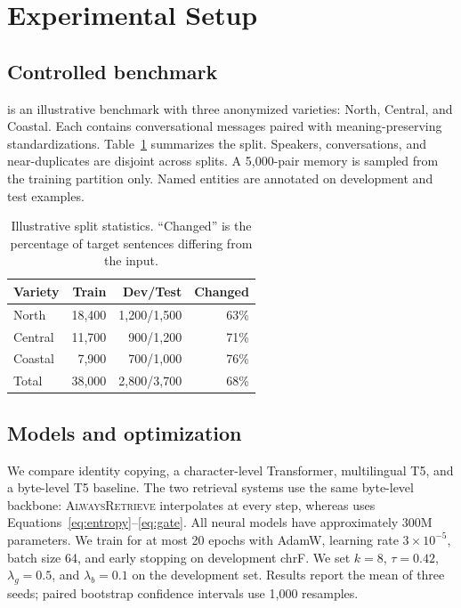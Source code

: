 \section{Experimental Setup}
\label{sec:setup}

\subsection{Controlled benchmark}

\dataset{} is an illustrative benchmark with three anonymized varieties:
North, Central, and Coastal. Each contains conversational messages paired
with meaning-preserving standardizations. Table~\ref{tab:data} summarizes the
split. Speakers, conversations, and near-duplicates are disjoint across
splits. A 5,000-pair memory is sampled from the training partition only.
Named entities are annotated on development and test examples.

\begin{table}[t]
  \centering
  \caption{Illustrative \dataset{} split statistics. ``Changed'' is the
  percentage of target sentences differing from the input.}
  \label{tab:data}
  \small
  \begin{tabular}{lrrr}
    \toprule
    Variety & Train & Dev/Test & Changed \\
    \midrule
    North   & 18,400 & 1,200/1,500 & 63\% \\
    Central & 11,700 &   900/1,200 & 71\% \\
    Coastal &  7,900 &   700/1,000 & 76\% \\
    \midrule
    Total   & 38,000 & 2,800/3,700 & 68\% \\
    \bottomrule
  \end{tabular}
\end{table}

\subsection{Models and optimization}

We compare identity copying, a character-level Transformer, multilingual T5,
and a byte-level T5 baseline. The two retrieval systems use the same
byte-level backbone: \textsc{AlwaysRetrieve} interpolates at every step,
whereas \method uses Equations~\ref{eq:entropy}--\ref{eq:gate}. All neural
models have approximately 300M parameters. We train for at most 20 epochs with
AdamW, learning rate $3\times10^{-5}$, batch size 64, and early stopping on
development chrF. We set $k=8$, $\tau=0.42$, $\lambda_g=0.5$, and
$\lambda_b=0.1$ on the development set. Results report the mean of three
seeds; paired bootstrap confidence intervals use 1,000 resamples.


